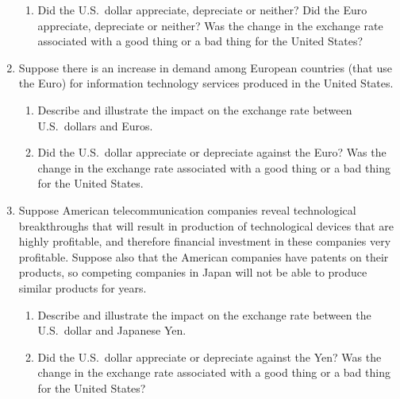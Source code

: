 \documentclass{assignment}
\begin{document}
\begin{enumerate}
\begin{enumerate}
\item Did the U.S.~dollar appreciate, depreciate or neither? Did the Euro appreciate, depreciate or
neither? Was the change in the exchange rate associated with a good thing or a bad thing for
the United States?

\vspace{3.0\baselineskip}

\end{enumerate}

\clearpage

\item Suppose there is an increase in demand among European countries (that use the Euro) for information
technology services produced in the United States.

\begin{enumerate}

\item Describe and illustrate the impact on the exchange rate between U.S.~dollars and Euros.

\vfill

\item Did the U.S.~dollar appreciate or depreciate against the Euro? Was the change in the exchange
rate associated with a good thing or a bad thing for the United States.

\vspace{5.0\baselineskip}

\end{enumerate}

\item Suppose American telecommunication companies reveal technological breakthroughs that will result
in production of technological devices that are highly profitable, and therefore financial investment
in these companies very profitable. Suppose also that the American companies have patents on their
products, so competing companies in Japan will not be able to produce similar products for years.

\begin{enumerate}

\item Describe and illustrate the impact on the exchange rate between the U.S.~dollar and Japanese
Yen.

\vfill

\vspace{-2.0\baselineskip}

\clearpage

\item Did the U.S.~dollar appreciate or depreciate against the Yen? Was the change in the exchange
rate associated with a good thing or a bad thing for the United States?


\end{enumerate}
\end{enumerate}
\end{document}
